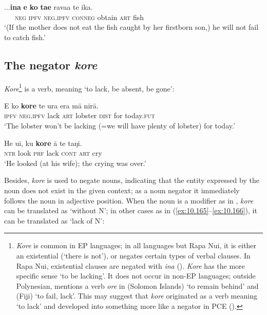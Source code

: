 \ea\label{ex:10.161}
\gll ...\textbf{{\ꞌ}ina} \textbf{e} \textbf{ko} \textbf{ta{\ꞌ}e} rava{\ꞌ}a te ika.\\
~~~\textsc{neg} \textsc{ipfv} \textsc{neg.ipfv} \textsc{conneg} obtain \textsc{art} fish\\

\glt 
‘(If the mother does not eat the fish caught by her firstborn son,) he will not fail to catch fish.’ \textstyleExampleref{[Ley-5-27.008]}
\z
{}
\subsection{The negator \textit{kore}}\label{sec:10.5.7}
\textit{Kore}\footnote{\label{fn:502}\textit{Kore} is common in EP languages; in all languages but Rapa Nui, it is either an existential  (‘there is not’), or negates certain types of verbal clauses. In Rapa Nui, existential clauses are negated with \textit{{\ꞌ}ina} (). \textit{Kore} has the more specific sense ‘to be lacking’. It does not occur in non-EP languages; outside Polynesian, \citet[98]{Clark1976} mentions a verb \textit{ore} in  (Solomon Islands) ‘to remain behind’ and  (Fiji) ‘to fail, lack’. This may suggest that \textit{kore} originated as a verb meaning ‘to lack’ and developed into something more like a negator in PCE (\citealt[101–102]{Clark1976}).} is a verb, meaning ‘to lack, be absent, be gone’:

\ea\label{ex:10.162}
\gll E ko \textbf{kore} te {\ꞌ}ura era mā nīrā. \\
\textsc{ipfv} \textsc{neg.ipfv} lack \textsc{art} lobster \textsc{dist} for today.\textsc{fut} \\

\glt 
‘The lobster won’t be lacking (=we will have plenty of lobster) for today.’ \textstyleExampleref{[R230.033]} 
\z

\ea\label{ex:10.163}
\gll He u{\ꞌ}i, ku \textbf{kore} {\ꞌ}ā te taŋi. \\
\textsc{ntr} look \textsc{prf} lack \textsc{cont} \textsc{art} cry \\

\glt 
‘He looked (at his wife); the crying was over.’ \textstyleExampleref{[Ley-9-55.076]}
\z

Besides, \textit{kore} is used to negate nouns, indicating that the entity expressed by the noun does not exist in the given context; as a noun negator it immediately follows the noun in adjective position. When the noun is a modifier as in , \textit{kore} can be translated as ‘without N’; in other cases as in (\ref{ex:10.165}–\ref{ex:10.166}), it can be translated as ‘lack of N’:

